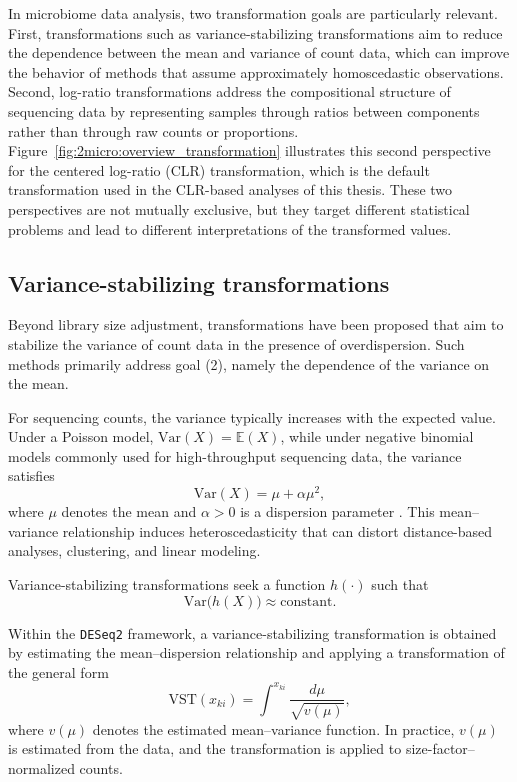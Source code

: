 In microbiome data analysis, two transformation goals are particularly relevant. First, transformations such as variance-stabilizing transformations aim to reduce the dependence between the mean and variance of count data, which can improve the behavior of methods that assume approximately homoscedastic observations. Second, log-ratio transformations address the compositional structure of sequencing data by representing samples through ratios between components rather than through raw counts or proportions. Figure~\ref{fig:2micro:overview_transformation} illustrates this second perspective for the centered log-ratio (CLR) transformation, which is the default transformation used in the CLR-based analyses of this thesis. These two perspectives are not mutually exclusive, but they target different statistical problems and lead to different interpretations of the transformed values.

\subsection{Variance-stabilizing transformations}
\label{sec:2micro:norm:vst}

Beyond library size adjustment, transformations have been proposed that aim to stabilize the variance of count data in the presence of overdispersion. 
Such methods primarily address goal (2), namely the dependence of the variance on the mean.

For sequencing counts, the variance typically increases with the expected value. 
Under a Poisson model, $\mathrm{Var}(X)=\mathbb{E}(X)$, while under negative binomial models commonly used for high-throughput sequencing data, the variance satisfies
\begin{equation}
\mathrm{Var}(X) = \mu + \alpha \mu^2,
\end{equation}
where $\mu$ denotes the mean and $\alpha>0$ is a dispersion parameter \citep{anders2010differential,robinson2010edger}. 
This mean–variance relationship induces heteroscedasticity that can distort distance-based analyses, clustering, and linear modeling.

Variance-stabilizing transformations seek a function $h(\cdot)$ such that
\begin{equation}
\mathrm{Var}\!\big(h(X)\big)
\approx \text{constant}.
\end{equation}

Within the \texttt{DESeq2} framework, a variance-stabilizing transformation is obtained by estimating the mean--dispersion relationship and applying a transformation of the general form \citep{love2014moderated}
\begin{equation}
\mathrm{VST}(x_{ki}) = \int^{x_{ki}} \frac{d\mu}{\sqrt{v(\mu)}},
\end{equation}
where $v(\mu)$ denotes the estimated mean–variance function. 
In practice, $v(\mu)$ is estimated from the data, and the transformation is applied to size-factor–normalized counts.

